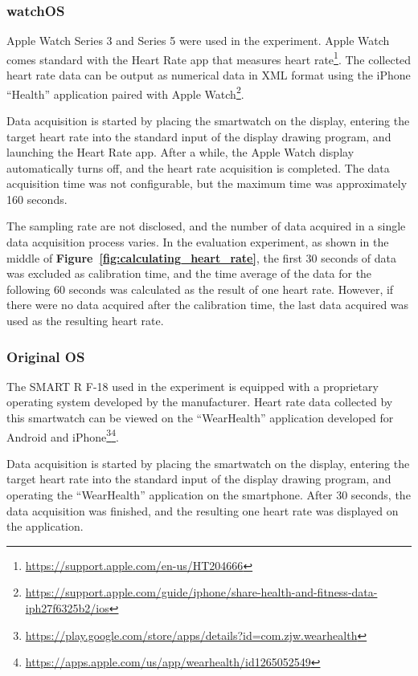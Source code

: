 \documentclass[sigchi,authordraft]{acmart}
\newcommand\figref[1]{\textbf{Figure~\ref{fig:#1}}}
\begin{document}
\subsubsection{watchOS}
\label{subsec:applewatch}
Apple Watch Series 3 and Series 5 were used in the experiment. Apple Watch comes standard with the Heart Rate app that measures heart rate\footnote{\url{https://support.apple.com/en-us/HT204666}}. The collected heart rate data can be output as numerical data in XML format using the iPhone ``Health'' application paired with Apple Watch\footnote{\url{https://support.apple.com/guide/iphone/share-health-and-fitness-data-iph27f6325b2/ios}}.\par

Data acquisition is started by placing the smartwatch on the display, entering the target heart rate into the standard input of the display drawing program, and launching the Heart Rate app. After a while, the Apple Watch display automatically turns off, and the heart rate acquisition is completed. The data acquisition time was not configurable, but the maximum time was approximately 160 seconds.\par

The sampling rate are not disclosed, and the number of data acquired in a single data acquisition process varies. In the evaluation experiment, as shown in the middle of \figref{calculating_heart_rate}, the first 30 seconds of data was excluded as calibration time, and the time average of the data for the following 60 seconds was calculated as the result of one heart rate. However, if there were no data acquired after the calibration time, the last data acquired was used as the resulting heart rate.

\subsubsection{Original OS}
\label{subsec:original}
The SMART R F-18 used in the experiment is equipped with a proprietary operating system developed by the manufacturer. Heart rate data collected by this smartwatch can be viewed on the ``WearHealth'' application developed for Android and iPhone\footnote{\url{https://play.google.com/store/apps/details?id=com.zjw.wearhealth}}\footnote{\url{https://apps.apple.com/us/app/wearhealth/id1265052549}}.\par

Data acquisition is started by placing the smartwatch on the display, entering the target heart rate into the standard input of the display drawing program, and operating the ``WearHealth'' application on the smartphone. After 30 seconds, the data acquisition was finished, and the resulting one heart rate was displayed on the application.\par
\end{document}
